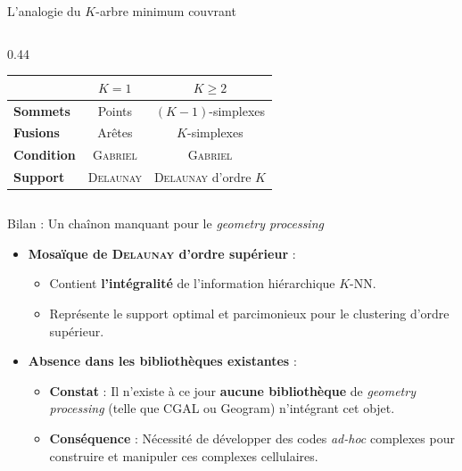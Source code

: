 \documentclass[A4,svgnames,9pt,aspectratio=169]{beamer}
\begin{document}
\begin{frame}{L'analogie du $K$-arbre minimum couvrant}
\begin{columns}[c, onlytextwidth]
\begin{column}{0.44\textwidth}
\begin{center}
                \vspace{0.5cm}
                \small
                \renewcommand{\arraystretch}{1.5}
                \begin{tabular}{lcc}
                    \toprule
                    & \textbf{$K = 1$} & \textbf{$K \ge 2$} \\
                    \midrule
                    \textbf{Sommets} & Points & $(K-1)$-simplexes \\
                    \textbf{Fusions} & Arêtes & $K$-simplexes \\
                    \textbf{Condition} & \textsc{Gabriel} & \textsc{Gabriel} \\
                    \textbf{Support} & \textsc{Delaunay} & \textsc{Delaunay} d'ordre $K$ \\
                    \bottomrule
                \end{tabular}
            \end{center}
        \end{column}
    \end{columns}
\end{frame}

\begin{frame}{Bilan : Un chaînon manquant pour le \emph{geometry processing}}
    \begin{itemize}
        \setlength{\itemsep}{12pt}
        \item \textbf{Mosaïque de \textsc{Delaunay} d'ordre supérieur} :
        \begin{itemize}
            \item Contient \textbf{l'intégralité} de l'information hiérarchique $K$-NN.
            \item Représente le support optimal et parcimonieux pour le clustering d'ordre supérieur.
        \end{itemize}
        
        \item \textbf{Absence dans les bibliothèques existantes} :
        \begin{itemize}
            \item \textbf{Constat} : Il n'existe à ce jour \textbf{aucune bibliothèque} de \emph{geometry processing} (telle que CGAL ou Geogram) n'intégrant cet objet.
            \item \textbf{Conséquence} : Nécessité de développer des codes \emph{ad-hoc} complexes pour construire et manipuler ces complexes cellulaires.
        \end{itemize}
    \end{itemize}
\end{frame}
\end{document}
